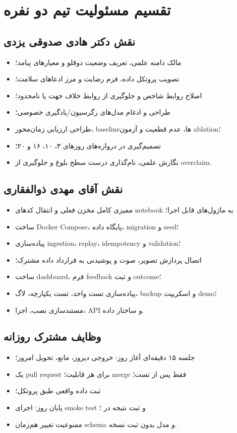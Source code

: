 \documentclass[11pt,a4paper]{article}
\newcommand{\code}[1]{\lr{\texttt{\detokenize{#1}}}}
\begin{document}
\section{تقسیم مسئولیت تیم دو نفره}

\subsection{نقش دکتر هادی صدوقی یزدی}
\begin{itemize}
  \item مالک دامنه علمی، تعریف وضعیت دوقلو و معیارهای پیامد؛
  \item تصویب پروتکل داده، فرم رضایت و مرز ادعاهای سلامت؛
  \item اصلاح روابط شاخص و جلوگیری از روابط خلاف جهت یا نامحدود؛
  \item طراحی و ادغام مدل‌های رگرسیون/یادگیری خصوصی؛
  \item طراحی ارزیابی زمان‌محور، baselineها، عدم قطعیت و آزمون ablation؛
  \item تصمیم‌گیری در دروازه‌های روزهای ۳، ۱۰، ۱۶ و ۲۰؛
  \item نگارش علمی، نام‌گذاری درست سطح بلوغ و جلوگیری از overclaim.
\end{itemize}

\subsection{نقش آقای مهدی ذوالفقاری}
\begin{itemize}
  \item ممیزی کامل مخزن فعلی و انتقال کدهای notebook به ماژول‌های قابل اجرا؛
  \item ساخت Docker Compose، پایگاه داده، migration و seed؛
  \item پیاده‌سازی ingestion، replay، idempotency و validation؛
  \item اتصال پردازش تصویر، صوت و پوشیدنی به قرارداد داده مشترک؛
  \item ساخت dashboard، فرم feedback و ثبت outcome؛
  \item پیاده‌سازی تست واحد، تست یکپارچه، لاگ، backup و اسکریپت demo؛
  \item مستندسازی نصب، اجرا، API و ساختار داده.
\end{itemize}

\subsection{وظایف مشترک روزانه}
\begin{itemize}
  \item جلسه ۱۵ دقیقه‌ای آغاز روز: خروجی دیروز، مانع، تحویل امروز؛
  \item یک pull request برای هر قابلیت؛ merge فقط پس از تست؛
  \item ثبت داده واقعی طبق پروتکل؛
  \item پایان روز: اجرای smoke test و ثبت نتیجه در \code{docs/daily_log.md}؛
  \item ممنوعیت تغییر هم‌زمان schema و مدل بدون ثبت نسخه.
\end{itemize}
\end{document}
